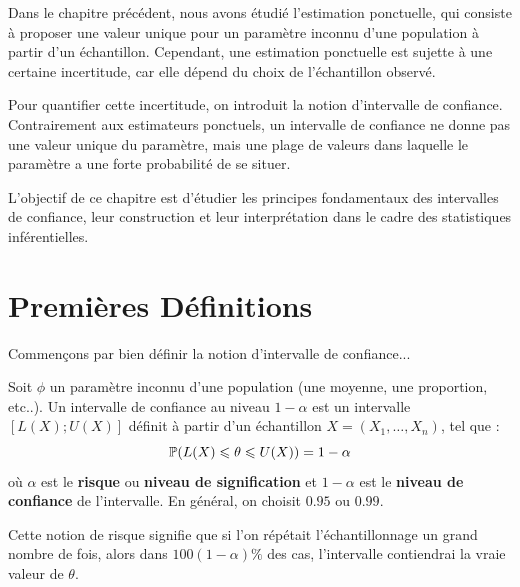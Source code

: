 
Dans le chapitre précédent, nous avons étudié l'estimation ponctuelle, qui consiste à proposer une 
valeur unique pour un paramètre inconnu d'une population à partir d’un échantillon. 
Cependant, une estimation ponctuelle est sujette à une certaine incertitude, car elle dépend du 
choix de l’échantillon observé.

Pour quantifier cette incertitude, on introduit la notion d’intervalle de confiance. 
Contrairement aux estimateurs ponctuels, un intervalle de confiance ne donne pas une valeur unique 
du paramètre, mais une plage de valeurs dans laquelle le paramètre a une forte probabilité de se situer.

L’objectif de ce chapitre est d’étudier les principes fondamentaux des intervalles de confiance, 
leur construction et leur interprétation dans le cadre des statistiques inférentielles.



\section{Premières Définitions}


Commençons par bien définir la notion d'intervalle de confiance... 

\begin{definition}
    Soit $\phi$ un paramètre inconnu d'une population (une moyenne, une proportion, etc..). 
    Un intervalle de confiance au niveau $1 - \alpha$ est un intervalle $[ L(X); U(X)]$ définit 
    à partir d'un échantillon $X = (X_1, \dots, X_n)$, tel que :
        \[ \mathbb{P}(L(X) \leqslant \theta \leqslant U(X)) = 1 - \alpha \] 
    où $\alpha$ est le \textbf{risque} ou \textbf{niveau de signification} et $1-\alpha$ 
    est le \textbf{niveau de confiance} de l'intervalle. En général, on choisit $0.95$ ou $0.99$. 
\end{definition}

Cette notion de risque signifie que si l'on répétait l'échantillonnage un grand nombre de fois, 
alors dans $100(1 - \alpha) \%$ des cas, l'intervalle contiendrai la vraie valeur de $\theta$. 

\vspace{0.3cm}

